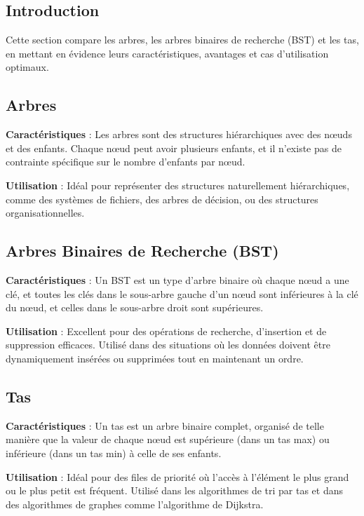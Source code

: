 \subsection{Introduction}\label{subsec:introduction}
Cette section compare les arbres, les arbres binaires de recherche (BST) et les tas, en mettant en évidence leurs caractéristiques, avantages et cas d'utilisation optimaux.

\subsection{Arbres}\label{subsec:arbres}
\textbf{Caractéristiques} : Les arbres sont des structures hiérarchiques avec des nœuds et des enfants.
Chaque nœud peut avoir plusieurs enfants, et il n'existe pas de contrainte spécifique sur le nombre d'enfants par nœud.

\textbf{Utilisation} : Idéal pour représenter des structures naturellement hiérarchiques, comme des systèmes de fichiers, des arbres de décision, ou des structures organisationnelles.

\subsection{Arbres Binaires de Recherche (BST)}\label{subsec:bst}
\textbf{Caractéristiques} : Un BST est un type d'arbre binaire où chaque nœud a une clé, et toutes les clés dans le sous-arbre gauche d'un nœud sont inférieures à la clé du nœud, et celles dans le sous-arbre droit sont supérieures.

\textbf{Utilisation} : Excellent pour des opérations de recherche, d'insertion et de suppression efficaces. Utilisé dans des situations où les données doivent être dynamiquement insérées ou supprimées tout en maintenant un ordre.

\subsection{Tas}\label{subsec:3-tas}
\textbf{Caractéristiques} : Un tas est un arbre binaire complet, organisé de telle manière que la valeur de chaque nœud est supérieure (dans un tas max) ou inférieure (dans un tas min) à celle de ses enfants.

\textbf{Utilisation} : Idéal pour des files de priorité où l'accès à l'élément le plus grand ou le plus petit est fréquent. Utilisé dans les algorithmes de tri par tas et dans des algorithmes de graphes comme l'algorithme de Dijkstra.

